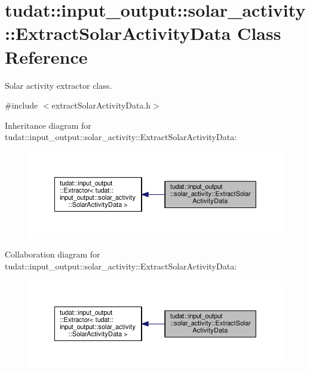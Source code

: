 \hypertarget{classtudat_1_1input__output_1_1solar__activity_1_1ExtractSolarActivityData}{}\section{tudat\+:\+:input\+\_\+output\+:\+:solar\+\_\+activity\+:\+:Extract\+Solar\+Activity\+Data Class Reference}
\label{classtudat_1_1input__output_1_1solar__activity_1_1ExtractSolarActivityData}


Solar activity extractor class.  




{\ttfamily \#include $<$extract\+Solar\+Activity\+Data.\+h$>$}



Inheritance diagram for tudat\+:\+:input\+\_\+output\+:\+:solar\+\_\+activity\+:\+:Extract\+Solar\+Activity\+Data\+:
\nopagebreak
\begin{figure}[H]
\begin{center}
\leavevmode
\includegraphics[width=350pt]{classtudat_1_1input__output_1_1solar__activity_1_1ExtractSolarActivityData__inherit__graph}
\end{center}
\end{figure}


Collaboration diagram for tudat\+:\+:input\+\_\+output\+:\+:solar\+\_\+activity\+:\+:Extract\+Solar\+Activity\+Data\+:
\nopagebreak
\begin{figure}[H]
\begin{center}
\leavevmode
\includegraphics[width=350pt]{classtudat_1_1input__output_1_1solar__activity_1_1ExtractSolarActivityData__coll__graph}
\end{center}
\end{figure}
